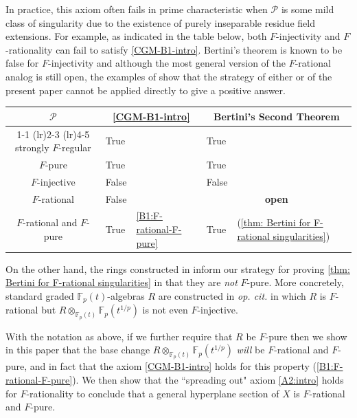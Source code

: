 \documentclass[reqno,11pt]{amsart}
\numberwithin{equation}{section}
\theoremstyle{definition}
\theoremstyle{definition}
\theoremstyle{definition}
\theoremstyle{remark}
\newcommand{\F}{\mathbb{F}}
\newcommand{\cP}{\mathcal{P}}
\begin{document}
In practice, this axiom often fails in prime characteristic when $\cP$ is some mild class of singularity due to the existence of purely inseparable residue field extensions. For example, as indicated in the table below, both $F$-injectivity and $F$-rationality can fail to satisfy \ref{CGM-B1-intro}. Bertini's theorem is known to be false for $F$-injectivity \cite[Theorem 7.5]{SZ13} and although the most general version of the $F$-rational analog is still open, the examples of \cite{QGSS24} show that the strategy of either \cite{CGM86} or of the present paper cannot be applied directly to give a positive answer. 


\begin{table}[htp!]
\centering
\begin{tabular}{c llll}
    \toprule
    $\cP$&\multicolumn{2}{c}{\ref{CGM-B1-intro}}&\multicolumn{2}{c}{Bertini's Second Theorem}\\
    \cmidrule(lr){1-1} \cmidrule(lr){2-3} \cmidrule(lr){4-5}
    strongly $F$-regular&True&\cite[Corollary 4.6]{SZ13}&True&\cite[Theorem 6.1]{SZ13}\\
    $F$-pure&True&\cite[Proposition 4.8]{SZ13}&True&\cite[Theorem 6.1]{SZ13}\\
    $F$-injective&False&\cite[Proposition 4.2]{Ene09}&False&\cite[Theorem 7.5]{SZ13}\\
    $F$-rational&False&\cite[Theorem 1.1]{QGSS24}&\multicolumn{2}{c}{\textbf{open}}\\
    \hdashline[2pt/5pt]
    $F$-rational and $F$-pure&True&\cref{B1:F-rational-F-pure} &True&(\cref{thm: Bertini for F-rational singularities})\\
    \bottomrule
    \end{tabular}
\end{table}

On the other hand, the rings constructed in \cite{QGSS24} inform our strategy for proving \cref{thm: Bertini for F-rational singularities} in that they are \emph{not} $F$-pure. More concretely, standard graded $\F_p(t)$-algebras $R$ are constructed in \emph{op. cit.} in which $R$ is $F$-rational but $R\otimes_{\F_p(t)} \F_p(t^{1/p})$ is not even $F$-injective. 

With the notation as above, if we further require that $R$ be $F$-pure then we show in this paper that the base change $R\otimes_{\F_p(t)} \F_p(t^{1/p})$ \textit{will} be $F$-rational and $F$-pure, and in fact that the axiom \ref{CGM-B1-intro} holds for this property (\cref{B1:F-rational-F-pure}). We then show that the ``spreading out" axiom \ref{A2:intro} holds for $F$-rationality to conclude that a general hyperplane section of $X$ is $F$-rational and $F$-pure.
\end{document}

